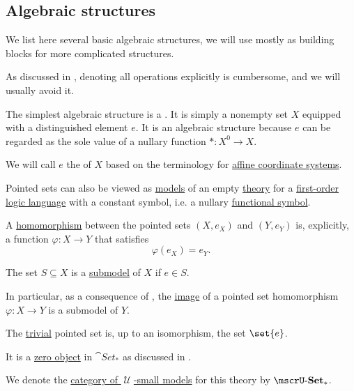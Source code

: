 \subsection{Algebraic structures}\label{subsec:algebraic_structures}

We list here several basic algebraic structures, we will use mostly as building blocks for more complicated structures.

As discussed in , denoting all operations explicitly is cumbersome, and we will usually avoid it.

\begin{definition}\label{def:pointed_set}
  The simplest algebraic structure is a . It is simply a nonempty set \( X \) equipped with a distinguished element \( e \). It is an algebraic structure because \( e \) can be regarded as the sole value of a nullary function \( *: X^0 \to X \).

  We will call \( e \) the  of \( X \) based on the terminology for \hyperref[def:euclidean_plane_coordinate_system/origin]{affine coordinate systems}.

  \begin{thmenum}
     Pointed sets can also be viewed as \hyperref[def:first_order_semantics/satisfiability]{models} of an empty \hyperref[def:first_order_theory]{theory} for a \hyperref[def:first_order_language]{first-order logic language} with a constant symbol, i.e. a nullary \hyperref[def:first_order_language/func]{functional symbol}.

     A \hyperref[def:first_order_homomorphism]{homomorphism} between the pointed sets \( (X, e_{X}) \) and \( (Y, e_{Y}) \) is, explicitly, a function \( \varphi: X \to Y \) that satisfies
    \begin{equation}\label{eq:def:pointed_set/homomorphism}
      \varphi(e_{X}) = e_{Y}.
    \end{equation}

     The set \( S \subseteq X \) is a \hyperref[thm:substructure_is_model]{submodel} of \( X \) if \( e \in S \).

    In particular, as a consequence of , the \hyperref[def:multi_valued_function/image]{image} of a pointed set homomorphism \( \varphi: X \to Y \) is a submodel of \( Y \).

     The \hyperref[thm:substructures_form_complete_lattice/bottom]{trivial} pointed set is, up to an isomorphism, the set \( \set{ e } \).

    It is a \hyperref[def:universal_objects/initial]{zero object} in \( \cat{Set_*} \) as discussed in .

     We denote the \hyperref[def:category_of_small_first_order_models]{category of \( \mscrU \)-small models} for this theory by \( \ucat{Set}_* \).
  \end{thmenum}
\end{definition}

